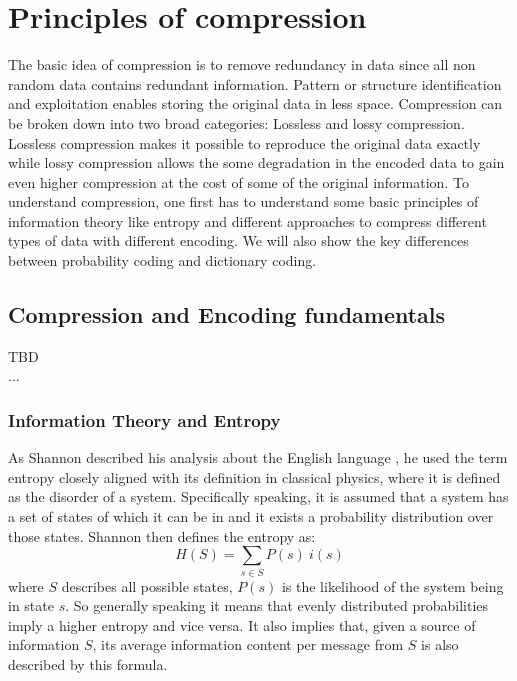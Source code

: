 
\chapter{Principles of compression}
\label{ch:Principles of compression}
\par{
The basic idea of compression is to remove redundancy in data since all non random data contains redundant information. Pattern or structure identification and exploitation enables storing the original data in less space. Compression can be broken down into two broad categories: Lossless and lossy compression. Lossless compression makes it possible to reproduce the original data exactly while lossy compression allows the some degradation in the encoded data to gain even higher compression at the cost of some of the original information. To understand compression, one first has to understand some basic principles of information theory like entropy and different approaches to compress different types of data with different encoding. We will also show the key differences between probability coding and dictionary coding.}

\section{Compression and Encoding fundamentals}
\label{ch:Principles of compression:sec:Compression}
TBD\\
...

\subsection{Information Theory and Entropy}
\par{
As Shannon described his analysis about the English language \cite{entropy}, he used the term entropy closely aligned with its definition in classical physics, where it is defined as the disorder of a system. Specifically speaking, it is assumed that a system has a set of states of which it can be in and it exists a probability distribution over those states. Shannon then defines the entropy as:
\[
H(S) = \sum_{s \in S} P(s) \: i(s)
\]
where $S$ describes all possible states, $P(s)$ is the likelihood of the system being in state $s$. So generally speaking it means that evenly distributed probabilities imply a higher entropy and vice versa.
It also implies that, given a source of information $S$, its average information content per message from $S$ is also described by this formula.}

